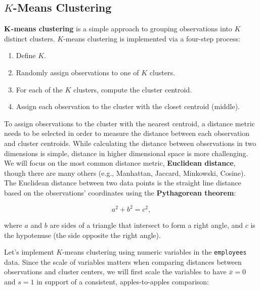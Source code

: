 \documentclass[
]{book}
\providecommand{\tightlist}{%
  \setlength{\itemsep}{0pt}\setlength{\parskip}{0pt}}
\begin{document}
\hypertarget{k-means-clustering}{%
\subsection{\texorpdfstring{\(K\)-Means Clustering}{K-Means Clustering}}\label{k-means-clustering}}

\(\textbf K\)\textbf{-means clustering} is a simple approach to grouping observations into \(K\) distinct clusters. \(K\)-means clustering is implemented via a four-step process:

\begin{enumerate}
\def\labelenumi{\arabic{enumi}.}
\tightlist
\item
  Define \(K\).
\item
  Randomly assign observations to one of \(K\) clusters.
\item
  For each of the \(K\) clusters, compute the cluster centroid.
\item
  Assign each observation to the cluster with the closet centroid (middle).
\end{enumerate}

To assign observations to the cluster with the nearest centroid, a distance metric needs to be selected in order to measure the distance between each observation and cluster centroids. While calculating the distance between observations in two dimensions is simple, distance in higher dimensional space is more challenging. We will focus on the most common distance metric, \textbf{Euclidean distance}, though there are many others (e.g., Manhattan, Jaccard, Minkowski, Cosine). The Euclidean distance between two data points is the straight line distance based on the observations' coordinates using the \textbf{Pythagorean theorem}:

\[ a^2 + b^2 = c^2, \]

where \(a\) and \(b\) are sides of a triangle that intersect to form a right angle, and \(c\) is the hypotenuse (the side opposite the right angle).

Let's implement \(K\)-means clustering using numeric variables in the \texttt{employees} data. Since the scale of variables matters when comparing distances between observations and cluster centers, we will first scale the variables to have \(\bar{x} = 0\) and \(s = 1\) in support of a consistent, apples-to-apples comparison:
\end{document}
